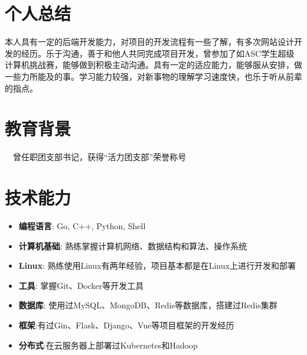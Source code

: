 \documentclass{resume}
\begin{document}



\section{个人总结}
本人具有一定的后端开发能力，对项目的开发流程有一些了解，有多次网站设计开发的经历。乐于沟通，善于和他人共同完成项目开发，曾参加了如ASC学生超级计算机挑战赛，能够做到积极主动沟通。具有一定的适应能力，能够服从安排，做一些力所能及的事。学习能力较强，对新事物的理解学习速度快，也乐于听从前辈的指点。

\section{教育背景}
\ \ 曾任职团支部书记，获得“活力团支部”荣誉称号

\section{技术能力}
\begin{itemize}[parsep=0.5ex]
  \item \textbf{编程语言}: Go, C++, Python, Shell
  \item \textbf{计算机基础}: 熟练掌握计算机网络、数据结构和算法、操作系统
  \item \textbf{Linux}: 熟练使用Linux有两年经验，项目基本都是在Linux上进行开发和部署
  \item \textbf{工具}: 掌握Git、Docker等开发工具
  \item \textbf{数据库}: 使用过MySQL、MongoDB、Redis等数据库，搭建过Redis集群
  \item \textbf{框架}:有过Gin、Flask、Django、Vue等项目框架的开发经历
  \item \textbf{分布式}:在云服务器上部署过Kubernetes和Hadoop
\end{itemize}
\end{document}

